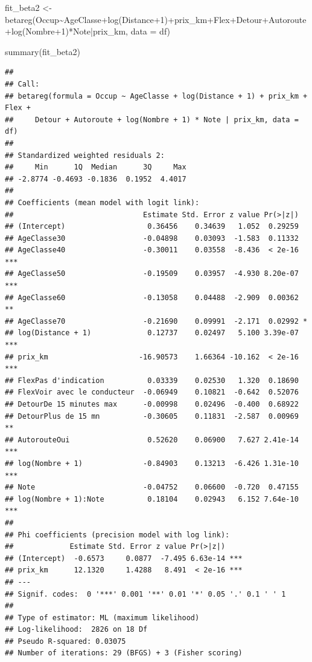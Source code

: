 \documentclass[
]{book}
\newenvironment{Shaded}{\begin{snugshade}}{\end{snugshade}}
\newcommand{\AttributeTok}[1]{\textcolor[rgb]{0.77,0.63,0.00}{#1}}
\newcommand{\DecValTok}[1]{\textcolor[rgb]{0.00,0.00,0.81}{#1}}
\newcommand{\FunctionTok}[1]{\textcolor[rgb]{0.00,0.00,0.00}{#1}}
\newcommand{\NormalTok}[1]{#1}
\newcommand{\OtherTok}[1]{\textcolor[rgb]{0.56,0.35,0.01}{#1}}
\newcommand{\SpecialCharTok}[1]{\textcolor[rgb]{0.00,0.00,0.00}{#1}}
\begin{document}
\begin{Shaded}
\begin{Highlighting}[]
\NormalTok{fit\_beta2 }\OtherTok{\textless{}{-}} \FunctionTok{betareg}\NormalTok{(Occup}\SpecialCharTok{\textasciitilde{}}\NormalTok{AgeClasse}\SpecialCharTok{+}\FunctionTok{log}\NormalTok{(Distance}\SpecialCharTok{+}\DecValTok{1}\NormalTok{)}\SpecialCharTok{+}\NormalTok{prix\_km}\SpecialCharTok{+}\NormalTok{Flex}\SpecialCharTok{+}\NormalTok{Detour}\SpecialCharTok{+}\NormalTok{Autoroute}\SpecialCharTok{+}\FunctionTok{log}\NormalTok{(Nombre}\SpecialCharTok{+}\DecValTok{1}\NormalTok{)}\SpecialCharTok{*}\NormalTok{Note}\SpecialCharTok{|}\NormalTok{prix\_km, }\AttributeTok{data =}\NormalTok{ df)}

\FunctionTok{summary}\NormalTok{(fit\_beta2)}
\end{Highlighting}
\end{Shaded}

\begin{verbatim}
## 
## Call:
## betareg(formula = Occup ~ AgeClasse + log(Distance + 1) + prix_km + Flex + 
##     Detour + Autoroute + log(Nombre + 1) * Note | prix_km, data = df)
## 
## Standardized weighted residuals 2:
##     Min      1Q  Median      3Q     Max 
## -2.8774 -0.4693 -0.1836  0.1952  4.4017 
## 
## Coefficients (mean model with logit link):
##                              Estimate Std. Error z value Pr(>|z|)    
## (Intercept)                   0.36456    0.34639   1.052  0.29259    
## AgeClasse30                  -0.04898    0.03093  -1.583  0.11332    
## AgeClasse40                  -0.30011    0.03558  -8.436  < 2e-16 ***
## AgeClasse50                  -0.19509    0.03957  -4.930 8.20e-07 ***
## AgeClasse60                  -0.13058    0.04488  -2.909  0.00362 ** 
## AgeClasse70                  -0.21690    0.09991  -2.171  0.02992 *  
## log(Distance + 1)             0.12737    0.02497   5.100 3.39e-07 ***
## prix_km                     -16.90573    1.66364 -10.162  < 2e-16 ***
## FlexPas d'indication          0.03339    0.02530   1.320  0.18690    
## FlexVoir avec le conducteur  -0.06949    0.10821  -0.642  0.52076    
## DetourDe 15 minutes max      -0.00998    0.02496  -0.400  0.68922    
## DetourPlus de 15 mn          -0.30605    0.11831  -2.587  0.00969 ** 
## AutorouteOui                  0.52620    0.06900   7.627 2.41e-14 ***
## log(Nombre + 1)              -0.84903    0.13213  -6.426 1.31e-10 ***
## Note                         -0.04752    0.06600  -0.720  0.47155    
## log(Nombre + 1):Note          0.18104    0.02943   6.152 7.64e-10 ***
## 
## Phi coefficients (precision model with log link):
##             Estimate Std. Error z value Pr(>|z|)    
## (Intercept)  -0.6573     0.0877  -7.495 6.63e-14 ***
## prix_km      12.1320     1.4288   8.491  < 2e-16 ***
## ---
## Signif. codes:  0 '***' 0.001 '**' 0.01 '*' 0.05 '.' 0.1 ' ' 1 
## 
## Type of estimator: ML (maximum likelihood)
## Log-likelihood:  2826 on 18 Df
## Pseudo R-squared: 0.03075
## Number of iterations: 29 (BFGS) + 3 (Fisher scoring)
\end{verbatim}
\end{document}
